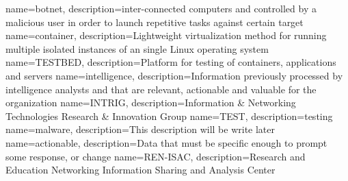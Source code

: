 %
%
{
    name=botnet,
    description={inter-connected computers and controlled by a malicious user in order to launch repetitive tasks against certain target}
}
{
	name=container,
	description={Lightweight virtualization method for running multiple isolated instances of an single Linux operating system}
}
{
    name=TESTBED,
    description={Platform for testing of containers, applications and servers}
}
{
    name=intelligence,
    description={Information previously processed by intelligence analysts and that are relevant, actionable and valuable for the organization}
}
{
    name=INTRIG,
    description={Information \& Networking Technologies Research \& Innovation Group}
}
{
    name=TEST,
    description={testing}
}
{
	name=malware,
	description={This description will be write later}
}
{
	name=actionable,
	description={Data that must be specific enough to prompt some response, or change}
}
{
	name=REN-ISAC,
	description={Research and Education Networking Information Sharing and Analysis Center}
}
